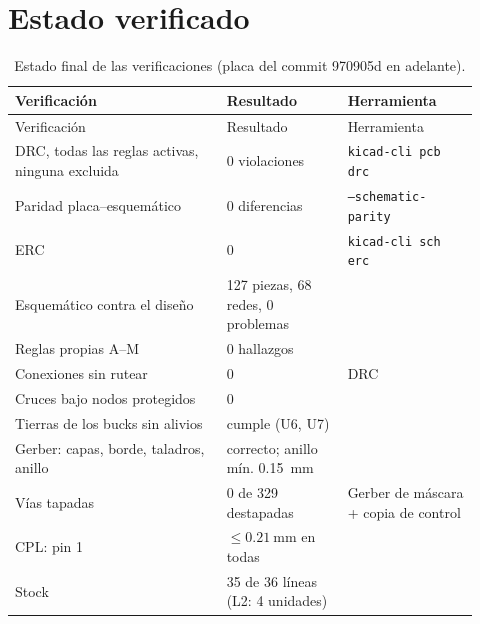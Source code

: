 \section{Estado verificado}\label{sec:c11-estado}

\begin{longtable}{@{}L{0.42\linewidth}L{0.24\linewidth}L{0.26\linewidth}@{}}
\caption{Estado final de las verificaciones (placa del commit 970905d en adelante).}\label{tab:c11-estado}\\
\toprule
Verificación & Resultado & Herramienta\\\midrule\endfirsthead
\toprule
Verificación & Resultado & Herramienta\\\midrule\endhead
DRC, todas las reglas activas, ninguna excluida & 0 violaciones & \texttt{kicad-cli pcb drc}\\
Paridad placa--esquemático & 0 diferencias & \texttt{--schematic-parity}\\
ERC & 0 & \texttt{kicad-cli sch erc}\\
Esquemático contra el diseño & 127 piezas, 68 redes, 0 problemas & \\
Reglas propias A--M & 0 hallazgos & \\
Conexiones sin rutear & 0 & DRC\\
Cruces bajo nodos protegidos & 0 & \\
Tierras de los bucks sin alivios & cumple (U6, U7) & \\
Gerber: capas, borde, taladros, anillo & correcto; anillo mín. \SI{0.15}{\milli\meter} & \\
Vías tapadas & 0 de 329 destapadas & Gerber de máscara + copia de control\\
CPL: pin 1 & $\le\SI{0.21}{\milli\meter}$ en todas & \\
Stock & 35 de 36 líneas (L2: 4 unidades) & \\
\bottomrule
\end{longtable}

